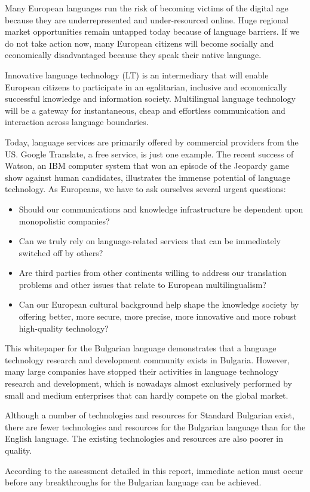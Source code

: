 \begin{multicols}{2}

Many European languages run the risk of becoming victims of the digital age because they are underrepresented and under-resourced online. Huge regional market opportunities remain untapped today because of language barriers. If we do not take action now, many European citizens will become socially and economically disadvantaged because they speak their native language.

Innovative language technology (LT) is an intermediary that will enable European citizens to participate in an egalitarian, inclusive and economically successful knowledge and information society. Multilingual language technology will be a gateway for instantaneous, cheap and effortless communication and interaction across language boundaries.

Today, language services are primarily offered by commercial providers from the US. Google Translate, a free service, is just one example. The recent success of Watson, an IBM computer system that won an episode of the Jeopardy game show against human candidates, illustrates the immense potential of language technology. As Europeans, we have to ask ourselves several urgent questions:

\begin{itemize}
\item Should our communications and knowledge infrastructure be dependent upon monopolistic companies?
\item Can we truly rely on language-related services that can be immediately switched off by others?
\item Are third parties from other continents willing to address our translation problems and other issues that relate to European multilingualism?
\item Can our European cultural background help shape the knowledge society by offering better, more secure, more precise, more innovative and more robust high-quality technology?
\end{itemize}

This whitepaper for the Bulgarian language demonstrates that a language technology research and development community exists in Bulgaria. However, many large companies have stopped their activities in language technology research and development, which is nowadays almost exclusively performed by small and medium enterprises that can hardly compete on the global market. 

Although a number of technologies and resources for Standard Bulgarian exist, there are fewer technologies and resources for the Bulgarian language than for the English language. The existing technologies and resources are also poorer in quality. 

According to the assessment detailed in this report, immediate action must occur before any breakthroughs for the Bulgarian language can be achieved.
\end{multicols}

